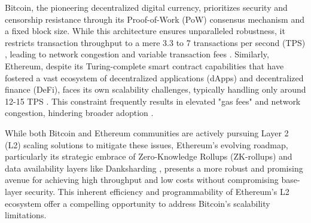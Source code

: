 \documentclass{DESSThesis}
\begin{document}
Bitcoin, the pioneering decentralized digital currency, prioritizes security and censorship resistance through its Proof-of-Work (PoW) consensus mechanism and a fixed block size. While this architecture ensures unparalleled robustness, it restricts transaction throughput to a mere 3.3 to 7 transactions per second (TPS) \cite{chauhan_blockchain_2018}, leading to network congestion and variable transaction fees \cite{kasahara_effect_2019}. Similarly, Ethereum, despite its Turing-complete smart contract capabilities that have fostered a vast ecosystem of decentralized applications (dApps) and decentralized finance (DeFi), faces its own scalability challenges, typically handling only around 12-15 TPS \cite{gogol_scaling_2025}. This constraint frequently results in elevated "gas fees" and network congestion, hindering broader adoption \cite{hossain_unraveling_2025}.

While both Bitcoin and Ethereum communities are actively pursuing Layer 2 (L2) scaling solutions to mitigate these issues, Ethereum's evolving roadmap, particularly its strategic embrace of Zero-Knowledge Rollups (ZK-rollups) and data availability layers like Danksharding \cite{noauthor_danksharding_2024,noauthor_ethereum_nodate_roadmap}, presents a more robust and promising avenue for achieving high throughput and low costs without compromising base-layer security. This inherent efficiency and programmability of Ethereum's L2 ecosystem offer a compelling opportunity to address Bitcoin's scalability limitations.
\end{document}
